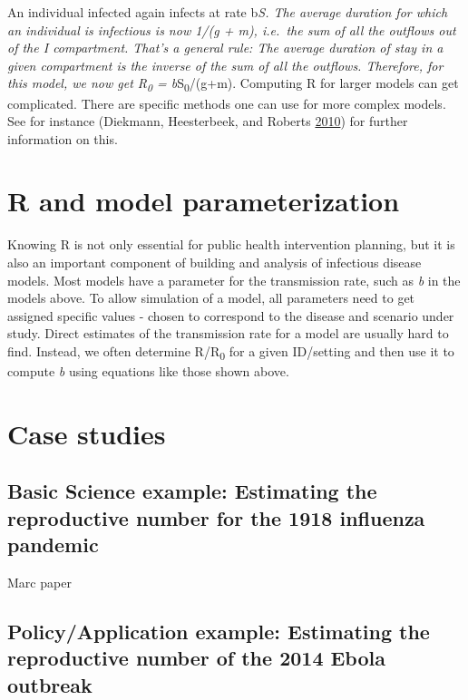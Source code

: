 \documentclass[]{book}
\theoremstyle{definition}
\theoremstyle{definition}
\theoremstyle{definition}
\theoremstyle{remark}
\begin{document}
An individual infected again infects at rate b\emph{S. The average
duration for which an individual is infectious is now 1/(g + m),
i.e.~the sum of all the outflows out of the \emph{I} compartment. That's
a general rule: The average duration of stay in a given compartment is
the inverse of the sum of all the outflows. Therefore, for this model,
we now get R\textsubscript{0} = b}S\textsubscript{0}/(g+m). Computing R
for larger models can get complicated. There are specific methods one
can use for more complex models. See for instance (Diekmann,
Heesterbeek, and Roberts \protect\hyperlink{ref-diekmann10}{2010}) for
further information on this.

\section{R and model
parameterization}\label{r-and-model-parameterization}

Knowing R is not only essential for public health intervention planning,
but it is also an important component of building and analysis of
infectious disease models. Most models have a parameter for the
transmission rate, such as \emph{b} in the models above. To allow
simulation of a model, all parameters need to get assigned specific
values - chosen to correspond to the disease and scenario under study.
Direct estimates of the transmission rate for a model are usually hard
to find. Instead, we often determine R/R\textsubscript{0} for a given
ID/setting and then use it to compute \emph{b} using equations like
those shown above.

\section{Case studies}\label{case-studies}

\subsection{Basic Science example: Estimating the reproductive number
for the 1918 influenza
pandemic}\label{basic-science-example-estimating-the-reproductive-number-for-the-1918-influenza-pandemic}

Marc paper

\subsection{Policy/Application example: Estimating the reproductive
number of the 2014 Ebola
outbreak}\label{policyapplication-example-estimating-the-reproductive-number-of-the-2014-ebola-outbreak}
\end{document}

